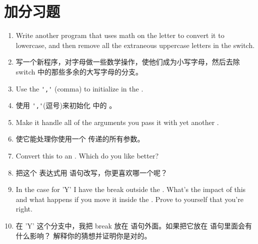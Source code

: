 \section{加分习题}
\begin{enumerate}
\item Write another program that uses math on the letter to
    convert it to lowercase, and then remove all the extraneous
    uppercase letters in the switch.
\item 写一个新程序，对字母做一些数学操作，使他们成为小写字母，然后去除 switch 中的那些多余的大写字母的分支。
\item Use the \verb|','| (comma) to initialize  
    in the .
\item 使用 \verb|','|(逗号)来初始化 中的 。
\item Make it handle all of the arguments you pass it with 
    yet another .
\item 使它能处理你使用一个 传递的所有参数。
\item Convert this  to an .
    Which do you like better?
\item 把这个  表达式用  语句改写，你更喜欢哪一个呢？
\item In the case for 'Y' I have the break outside the . What's the impact of this
    and what happens if you move it inside the . Prove to yourself that you're right.
\item 在 'Y' 这个分支中，我把 break 放在  语句外面。如果把它放在  语句里面会有什么影响？
解释你的猜想并证明你是对的。
\end{enumerate}

